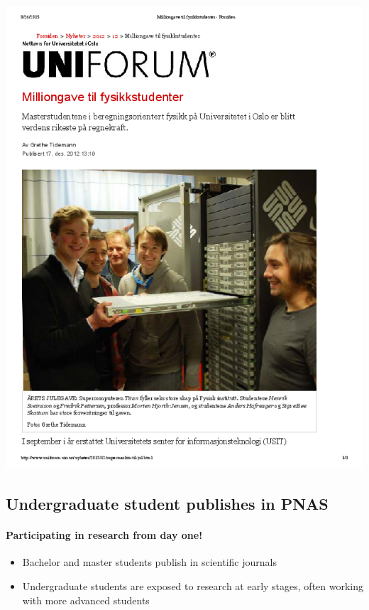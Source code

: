 \documentclass[%
twoside,                 %
final,                   %
10pt]{article}
\begin{document}



\centerline{\includegraphics[width=1.0\linewidth]{fig-future/uniforum-0.png}}




\subsection*{Undergraduate student publishes in PNAS}

\paragraph{Participating in research from day one!}
\begin{itemize}
\item Bachelor and master students publish in scientific journals 

\item Undergraduate students are exposed to research at early stages, often working with more advanced students
\end{itemize}
\end{document}
